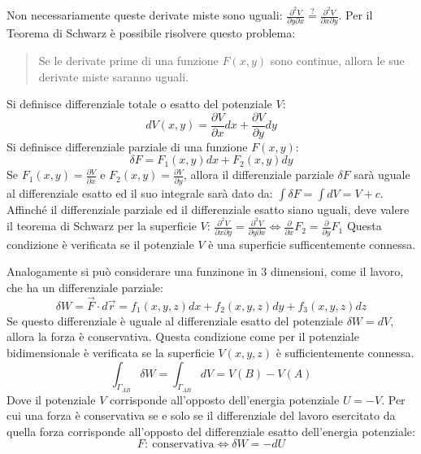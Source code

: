 \documentclass{article}
\numberwithin{equation}{subsection}
\begin{document}
Non necessariamente queste derivate miste sono uguali: 
$\displaystyle\frac{\partial^{2} V}{\partial y\partial x}\stackrel{?}{=}\displaystyle\frac{\partial^{2} V}{\partial x\partial y}$.
Per il Teorema di Schwarz è possibile risolvere questo problema: 
\begin{quotation}
    Se le derivate prime di una funzione $F(x,y)$ sono continue, 
    allora le sue derivate miste saranno uguali.
\end{quotation}




Si definisce differenziale totale o esatto del potenziale $V$:
\begin{equation*}
    dV(x,y)=\displaystyle\frac{\partial V}{\partial x}dx+\frac{\partial V}{\partial y}dy
\end{equation*}
Si definisce differenziale parziale di una funzione $F(x,y)$:
\begin{equation*}
    \delta F=F_1(x,y)dx+F_2(x,y)dy
\end{equation*}
Se $F_1(x,y) = \displaystyle\frac{\partial V}{\partial x}$ e 
$F_2(x,y) = \displaystyle\frac{\partial V}{\partial y}$, 
allora il differenziale parziale $\delta F$ sarà uguale al 
differenziale esatto ed il suo integrale sarà dato da:
$\displaystyle\int\delta F=\int dV=V+c$.
Affinché il differenziale parziale ed il differenziale esatto 
siano uguali, deve valere il teorema di Schwarz per la superficie 
$V$:
$\displaystyle\frac{\partial ^{2}V}{\partial x\partial y}=\frac{\partial ^{2}V}{\partial y\partial x}\iff \frac{\partial}{\partial x}F_2=\frac{\partial}{\partial y}F_1$
Questa condizione è verificata se il potenziale $V$ è una 
superficie sufficentemente connessa. 


Analogamente si può considerare una funzinone in $3$ dimensioni, 
come il lavoro, che ha un differenziale parziale: 
\begin{equation*}
    \delta W=\vec{F}\cdot d\vec{r}=f_1(x,y,z)dx+f_2(x,y,z)dy+f_3(x,y,z)dz
\end{equation*}
Se questo differenziale è uguale al differenziale 
esatto del potenziale $\delta W =dV$, allora la forza 
è conservativa. Questa condizione come per il potenziale bidimensionale è verificata se la superficie $V(x,y,z)$ è sufficientemente connessa. 
\begin{equation}
    \int_{\Gamma_{AB}}\delta W = \int_{\Gamma_{AB}}dV=V(B)-V(A)
\end{equation}
Dove il potenziale $V$ corrisponde all'opposto dell'energia 
potenziale $U=-V$.
Per cui una forza è conservativa se e solo se il differenziale del lavoro esercitato da quella forza corrisponde all'opposto del differenziale esatto dell'energia potenziale: 
\begin{equation}
    F:\:\mbox{conservativa}\iff\delta W=-dU
\end{equation}
\end{document}
